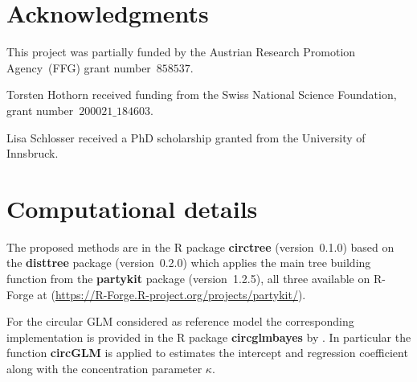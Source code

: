 \documentclass[nojss]{jss}
\numberwithin{equation}{section}
\begin{document}


\section*{Acknowledgments}
This project was partially funded by the Austrian Research Promotion 
Agency~(FFG) grant number~$858537$.

Torsten Hothorn received funding from the Swiss National Science
Foundation, grant number~$200021\_184603$.

Lisa Schlosser received a PhD scholarship granted from the University of Innsbruck.


\section*{Computational details}

The proposed methods are in the \textsf{R} package \textbf{circtree}
(version~0.1.0) based on the \textbf{disttree}
package (version~0.2.0) which applies the main
tree building function from the  \textbf{partykit} package 
(version~1.2.5), all three available 
on \textsf{R}-Forge at
(\url{https://R-Forge.R-project.org/projects/partykit/}). 


For the circular GLM considered as reference model the corresponding implementation is provided 
in the \textsf{R} package \textbf{circglmbayes} by \cite{Mulder+Klugkist:2017}. In particular the 
function \textbf{circGLM} is applied to estimates the intercept and regression coefficient along with 
the concentration parameter $\kappa$.



\end{document}
